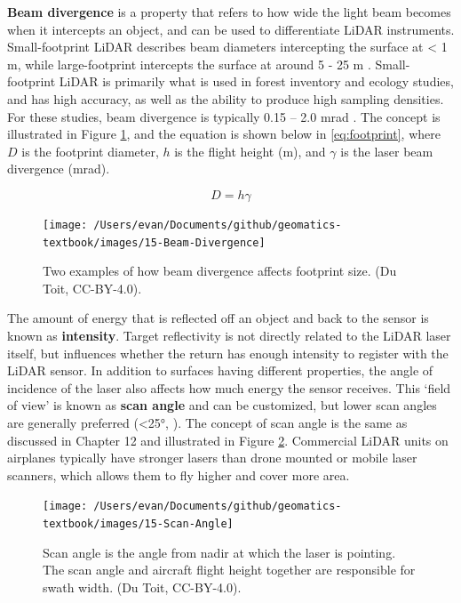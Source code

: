 \documentclass[
]{book}
\begin{document}
\textbf{Beam divergence} is a property that refers to how wide the light beam becomes when it intercepts an object, and can be used to differentiate LiDAR instruments. Small-footprint LiDAR describes beam diameters intercepting the surface at \textless{} 1 m, while large-footprint intercepts the surface at around 5 - 25 m \citep{Lim2003}. Small-footprint LiDAR is primarily what is used in forest inventory and ecology studies, and has high accuracy, as well as the ability to produce high sampling densities. For these studies, beam divergence is typically 0.15 -- 2.0 mrad \citep{White2013}. The concept is illustrated in Figure \ref{fig:15-Beam-Divergence}, and the equation is shown below in \eqref{eq:footprint}, where \(D\) is the footprint diameter, \(h\) is the flight height (m), and \(\gamma\) is the laser beam divergence (mrad).

\begin{equation} 
  D = h \gamma
  \label{eq:footprint}
\end{equation}

\begin{figure}
\texttt{[image: /Users/evan/Documents/github/geomatics-textbook/images/15-Beam-Divergence]} \caption{Two examples of how beam divergence affects footprint size. (Du Toit, CC-BY-4.0).}\label{fig:15-Beam-Divergence}
\end{figure}

The amount of energy that is reflected off an object and back to the sensor is known as \textbf{intensity}. Target reflectivity is not directly related to the LiDAR laser itself, but influences whether the return has enough intensity to register with the LiDAR sensor. In addition to surfaces having different properties, the angle of incidence of the laser also affects how much energy the sensor receives. This `field of view' is known as \textbf{scan angle} and can be customized, but lower scan angles are generally preferred (\textless25°, \citet{White2013}). The concept of scan angle is the same as discussed in Chapter 12 and illustrated in Figure \ref{fig:15-Scan-Angle}. Commercial LiDAR units on airplanes typically have stronger lasers than drone mounted or mobile laser scanners, which allows them to fly higher and cover more area.

\begin{figure}
\texttt{[image: /Users/evan/Documents/github/geomatics-textbook/images/15-Scan-Angle]} \caption{Scan angle is the angle from nadir at which the laser is pointing. The scan angle and aircraft flight height together are responsible for swath width. (Du Toit, CC-BY-4.0).}\label{fig:15-Scan-Angle}
\end{figure}
\end{document}
